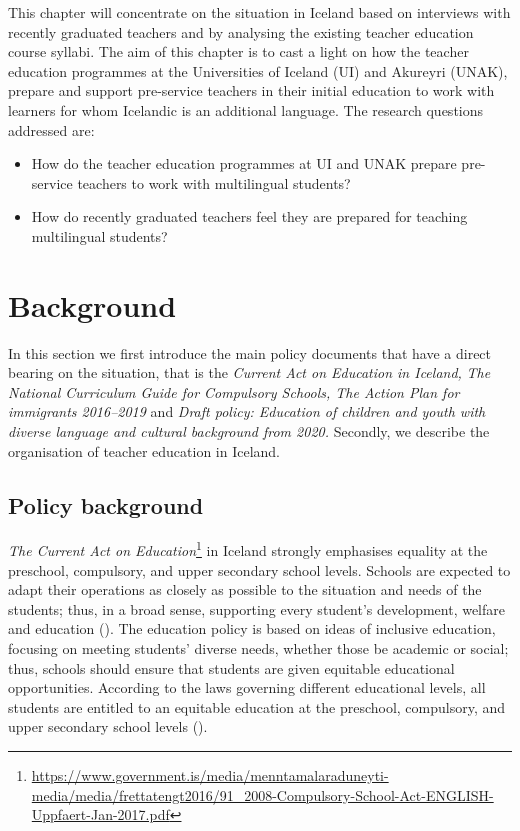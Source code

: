 \documentclass[output=paper]{langscibook}
\begin{document}
This chapter will concentrate on the situation in Iceland based on interviews with recently graduated teachers and by analysing the existing teacher education course syllabi. The aim of this chapter is to cast a light on how the teacher education programmes at the Universities of Iceland (UI) and Akureyri (UNAK), prepare and support pre-service teachers in their initial education to work with learners for whom Icelandic is an additional language. The research questions addressed are:

\begin{itemize}
\item How do the teacher education programmes at UI and UNAK prepare pre-service teachers to work with multilingual students? 
\item How do recently graduated teachers feel they are prepared for teaching multilingual students? 
\end{itemize}

\section{Background}

In this section we first introduce the main policy documents that have a direct bearing on the situation, that is the \textit{Current Act on Education in Iceland,} \textit{The National Curriculum Guide for Compulsory Schools, The Action Plan for immigrants 2016–2019} and \textit{Draft policy: Education of children and youth with diverse language and cultural background from 2020.} Secondly, we describe the organisation of teacher education in Iceland.

\subsection{Policy background} %

\textit{The Current Act on Education}\footnote{\url{https://www.government.is/media/menntamalaraduneyti-media/media/frettatengt2016/91_2008-Compulsory-School-Act-ENGLISH-Uppfaert-Jan-2017.pdf}} in Iceland strongly emphasises equality at the preschool, compulsory, and upper secondary school levels. Schools are expected to adapt their operations as closely as possible to the situation and needs of the students; thus, in a broad sense, supporting every student’s development, welfare and education (\citealt{Ministry_of_education_science_and_culture2011}). The education policy is based on ideas of inclusive education, focusing on meeting students’ diverse needs, whether those be academic or social; thus, schools should ensure that students are given equitable educational opportunities. According to the laws governing different educational levels, all students are entitled to an equitable education at the preschool, compulsory, and upper secondary school levels (\citealt{Ministry_of_education_science_and_culture2011}).
\end{document}
